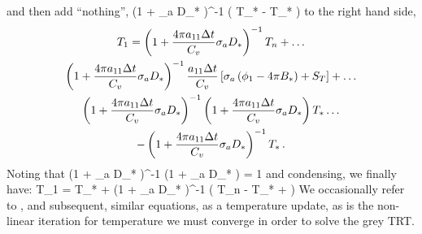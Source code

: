 and then add ``nothing'',
\benum
\left(1 +  \sigma_a D_*  \right)^{-1} \left( T_* - T_* \right) \pec
\eenum
to the right hand side,
\begin{multline}
T_1 = \left(1 + \frac{4\pi a_{11} \Delta t}{C_v} \sigma_a D_*  \right)^{-1} T_n + \dots \\
\left(1 + \frac{4\pi a_{11} \Delta t}{C_v} \sigma_a D_*  \right)^{-1} \frac{a_{11} \Delta t }{C_v} \left[ \sigma_a \left( \phi_1 - 4\pi   B_* \right) + S_T \right] + \dots \\
\left(1 + \frac{4\pi a_{11} \Delta t}{C_v} \sigma_a D_*  \right)^{-1} \left(1 + \frac{ 4\pi a_{11} \Delta t }{C_v} \sigma_a D_* \right) T_* \dots \\
-\left(1 + \frac{4\pi a_{11} \Delta t}{C_v} \sigma_a D_*  \right)^{-1} T_*\, .
\end{multline}
Noting that 
\benum
\left(1 +  \sigma_a D_*  \right)^{-1} \left(1 +  \sigma_a D_* \right)  = 1 \pec
\eenum
and condensing, we finally have:
\benum
T_1 = T_* + \left(1 +  \sigma_a D_*  \right)^{-1} \left( T_n - T_* +    \right) \pep
\label{eq:analytic_t_1}
\eenum
We occasionally refer to , and subsequent, similar equations, as a temperature update, as  is the non-linear iteration for temperature we must converge in order to solve the grey TRT.

